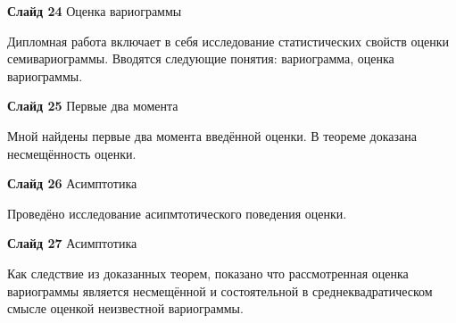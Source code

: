 \documentclass[a4paper,10pt]{report}
\begin{document}
\textbf{Слайд 24} Оценка вариограммы

Дипломная работа включает в себя исследование статистических свойств оценки семивариограммы. Вводятся следующие понятия: вариограмма, оценка вариограммы.

\textbf{Слайд 25} Первые два момента

Мной найдены первые два момента введённой оценки. В теореме доказана несмещённость оценки.

\textbf{Слайд 26} Асимптотика

Проведёно исследование асипмтотического поведения оценки.

\textbf{Слайд 27} Асимптотика

Как следствие из доказанных теорем, показано что рассмотренная оценка вариограммы является несмещённой и состоятельной в среднеквадратическом смысле оценкой неизвестной вариограммы.
\end{document}
